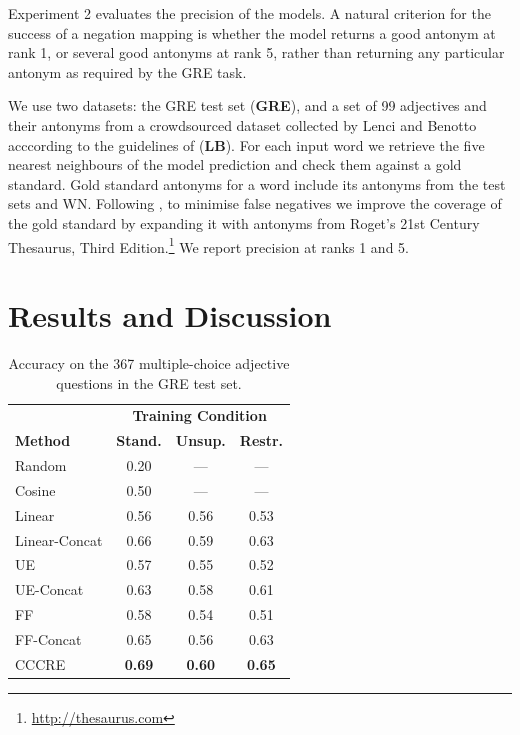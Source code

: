 \documentclass[11pt]{article}
\begin{document}
Experiment 2 evaluates the precision of the models. 
A natural criterion for the success of a negation mapping is whether the model returns a good antonym at rank 1, or several good antonyms at rank 5, rather than returning any particular antonym as required by the GRE task.


We use two datasets: the GRE test set ({\bf GRE}), and a set of 99 adjectives and their
antonyms from a crowdsourced dataset collected by Lenci and Benotto
acccording to the guidelines of \citet{walde:13} ({\bf LB}). For each input word we retrieve the five nearest neighbours of the model prediction and 
check them against a gold standard.
Gold standard antonyms for a word include its antonyms from the test sets and WN. Following \citet{gorman:05}, to minimise false negatives we improve the coverage of the gold standard by expanding it with antonyms from 
Roget's 21st Century Thesaurus, Third
Edition.\footnote{\url{http://thesaurus.com}} We report precision at
ranks 1 and 5.


\section{Results and Discussion}
\begin{table}[t!]
\centering
\small
\begin{tabular}{lccc}
 & \multicolumn{3}{c}{\bf Training Condition} \\
\bf Method & \bf Stand. & \bf Unsup. & \bf Restr. \\
\hline
\hline
Random & 0.20 & --- & --- \\
Cosine & 0.50 & --- & --- \\
\hline
Linear & 0.56 & 0.56 & 0.53 \\
Linear-Concat & 0.66 & 0.59 & 0.63 \\
\hline
UE & 0.57 & 0.55 & 0.52 \\
UE-Concat & 0.63 & 0.58 & 0.61 \\
FF & 0.58 & 0.54 & 0.51 \\
FF-Concat & 0.65 & 0.56 & 0.63 \\
\hline
CCCRE & \bf 0.69 & \bf 0.60 & \bf 0.65 \\
\end{tabular} 
\caption{Accuracy on the 367 multiple-choice adjective questions in the GRE test set.}
\label{t:gre}
\end{table}
\end{document}
